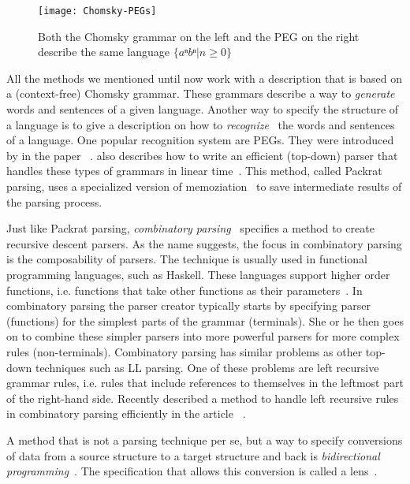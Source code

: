 \begin{figure}
  \centering
    \texttt{[image: Chomsky-PEGs]}
  \caption{Both the Chomsky grammar on the left and the PEG on the right describe the same language $ \{ aⁿ bⁿ | n ≥ 0 \} $}
\end{figure}

All the methods we mentioned until now work with a description that is based on a (context-free) Chomsky grammar. These grammars describe a way to \emph{generate} words and sentences of a given language. Another way to specify the structure of a language is to give a description on how to \emph{recognize}~\cite[p. 506]{grune2007parsing} the words and sentences of a language. One popular recognition system are \glspl{PEG}. They were introduced by \citeauthor{ford2004parsing} in the paper ~\cite{ford2004parsing}. \citeauthor{ford2002packrat} also describes how to write an efficient (top-down) parser that handles these types of grammars in linear time~\cite{ford2002packrat}. This method, called Packrat parsing, uses a specialized version of memoziation~\cite[p. 1]{ford2002packrat} to save intermediate results of the parsing process.

Just like Packrat parsing, \emph{combinatory parsing}~\cite{frost1992constructing, hutton1992higher} specifies a method to create recursive descent parsers. As the name suggests, the focus in combinatory parsing is the composability of parsers. The technique is usually used in functional programming languages, such as Haskell. These languages support higher order functions, i.e. functions that take other functions as their parameters~\cite[p. 564]{grune2007parsing}. In combinatory parsing the parser creator typically starts by specifying parser (functions) for the simplest parts of the grammar (terminals). She or he then goes on to combine these simpler parsers into more powerful parsers for more complex rules (non-terminals). Combinatory parsing has similar problems as other top-down techniques such as LL parsing. One of these problems are left recursive grammar rules, i.e. rules that include references to themselves in the leftmost part of the right-hand side. Recently \citeauthor{frost2007modular} described a method to handle left recursive rules in combinatory parsing efficiently in the article ~\cite{frost2007modular}.

A method that is not a parsing technique per se, but a way to specify conversions of data from a source structure to a target structure and back is \emph{bidirectional programming}~\cite{foster2005combinators, bohannon2006relational}. The specification that allows this conversion is called a lens~\cite{foster2005combinators}.

